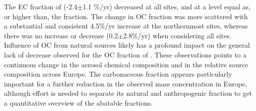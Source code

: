 The EC fraction of \pmfine (-2.4$\pm$1.1 \%/yr) decreased at all
sites, and at a level equal as, or higher than, the  fraction. The
change in OC fraction was more scattered with a substantial and
consistent 4.5\%/yr increase at the northernmost sites, whereas
there was no increase or decrease (0.2$\pm$2.8\%/yr) when considering
all sites. Influence of OC from natural sources likely has a profound
impact on the general lack of decrease observed for the OC fraction of
\pmfine. These observations points to a continuous change in the aerosol
chemical composition and in the relative source composition across
Europe. The carbonaceous fraction appears particularly important for a
further reduction in the observed \pmfine mass concentration in Europe,
although effort is needed to separate its natural and anthropogenic
fraction to get a quantitative overview of the abatable fractions.


\clearpage
\renewcommand\bibname{References}      %

